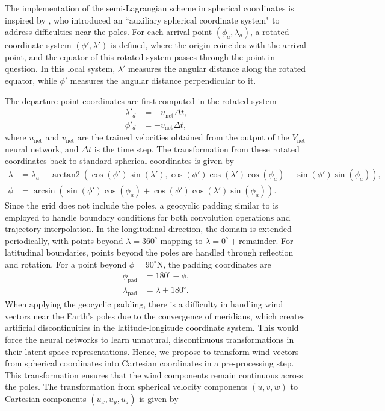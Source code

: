 \documentclass[preprint]{article}
\DeclareMathOperator{\arctantwo}{arctan2}
\begin{document}
\begin{appendices}
The implementation of the semi-Lagrangian scheme in spherical coordinates is inspired by \cite{mcdonald1989semi}, who introduced an ``auxiliary spherical coordinate system" to address difficulties near the poles. For each arrival point $(\phi_a, \lambda_a)$, a rotated coordinate system $(\phi', \lambda')$ is defined, where the origin coincides with the arrival point, and the equator of this rotated system passes through the point in question. In this local system, $\lambda'$ measures the angular distance along the rotated equator, while $\phi'$ measures the angular distance perpendicular to it.

The departure point coordinates are first computed in the rotated system
\begin{align*} 
    \lambda'_d &= -u_\text{net} \Delta t, \\
    \phi'_d &= -v_\text{net} \Delta t, 
\end{align*} 
where $u_\text{net}$ and $v_\text{net}$ are the trained velocities obtained from the output of the $V_\text{net}$ neural network, and $\Delta t$ is the time step. The transformation from these rotated coordinates back to standard spherical coordinates is given by
\begin{align*} 
\lambda &= \lambda_a + \arctantwo(\cos(\phi')\sin(\lambda'),\cos(\phi')\cos(\lambda')\cos(\phi_a) - \sin(\phi')\sin(\phi_a)),  \\
\phi &=  \arcsin\left( \sin(\phi')\cos(\phi_a) +\cos(\phi')\cos(\lambda')\sin(\phi_a) \right).
\end{align*}
Since the grid does not include the poles, a geocyclic padding similar to \cite{cheon2024karina} is employed to handle boundary conditions for both convolution operations and trajectory interpolation. In the longitudinal direction, the domain is extended periodically, with points beyond $\lambda = 360^\circ$ mapping to $\lambda = 0^\circ + \text{remainder}$. For latitudinal boundaries, points beyond the poles are handled through reflection and rotation. For a point beyond $\phi = 90^\circ\text{N}$, the padding coordinates are
\begin{align*}
\phi_\text{pad} &= 180^\circ - \phi, \\
\lambda_\text{pad} &= \lambda + 180^\circ.
\end{align*}
When applying the geocyclic padding, there is a difficulty in handling wind vectors near the Earth's poles due to the convergence of meridians, which creates artificial discontinuities in the latitude-longitude coordinate system. This would force the neural networks to learn unnatural, discontinuous transformations in their latent space representations. Hence, we propose to transform wind vectors from spherical coordinates into Cartesian coordinates in a pre-processing step. This transformation ensures that the wind components remain continuous across the poles. The transformation from spherical velocity components $(u, v, w)$ to Cartesian components $(u_x, u_y, u_z)$ is given by

\end{appendices}
\end{document}
